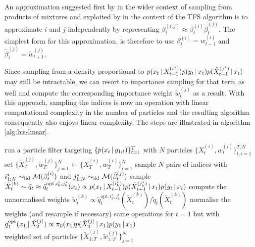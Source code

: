 An approximation suggested first by \citet{briers05} in the wider context of sampling from products of mixtures and exploited by \citet{fearnhead10, taghavi12} in the context of the TFS algorithm is to approximate $i$ and $j$ independently by representing $\beta^{(i,j)}_{t}\approx \beta^{(i)}_{t}\tilde\beta^{(j)}_{t}$. The simplest form for this approximation, is therefore to use $\beta^{(i)}_{t} = w^{(i)}_{t-1}$ and $\tilde\beta^{(j)}_{t}=\tilde w^{(j)}_{t+1}$. 

Since sampling from a density proportional to $p(x_{t}\,|\, X^{(i^{\star})}_{t-1})p(y_{t}\,|\, x_{t})p(\tilde X^{(j^{\star})}_{t+1}\,|\, x_{t})$ may still be intractable, we can resort to importance sampling for that term as well and compute the corresponding importance weight $\tilde w_{t}^{(j)}$ as a result.
With this approach, sampling the indices is now an operation with linear computational complexity in the number of particles and the resulting algorithm consequently also enjoys linear complexity. 
The steps are illustrated in algorithm \ref{alg:bis-linear}. 
%
\begin{algorithm}[!h]\small
	\caption{\label{alg:bis-linear}}
	\begin{algorithmic}[1]
		\State run a particle filter targeting $\{p(x_{t}\,|\, y_{1:t})\}_{t=1}^{T}$ with $N$ particles $\{X^{(i)}_{t}, w^{(i)}_{t}\}_{t,i=1}^{T,N}$
		\State set $\{\tilde X^{(j)}_{T},\tilde w^{(j)}_{T}\}_{j=1}^{N}\leftarrow \{X^{(i)}_{T},w^{(i)}_{T}\}_{i=1}^{N}$
			\State sample $N$ pairs of indices with $i^{\star}_{1:N} \sim_{\mathrm{iid}} \mathcal M(\beta^{(i)}_{t})$ and $j^{\star}_{1:N}\sim_{\mathrm{iid}} \mathcal M(\tilde\beta^{(j)}_{t})$
				\State sample $\tilde X^{(k)}_{t}\sim \tilde  q_{t} \approx \tilde q_{t}^{\text{opt}, i^{\star}_{k}, j^{\star}_{k}}(x_{t}) \propto p(x_{t}\,|\, X^{(i^{\star}_{k})}_{t-1})p(\tilde X^{(j^{\star}_{k})}_{t+1}\,|\, x_{t})p(y_{t}\,|\, x_{t})$
	    			\State compute the unnormalised weights $\tilde w^{(k)}_{t} \propto \tilde q^{\text{opt}, i^{\star}_{k},j^{\star}_{k}}_{t}(\tilde X^{(k)}_{t})/\tilde q_{t}(\tilde X^{(k)}_{t})$
			\EndFor
			\State normalise the weights (and resample if necessary)
		\EndFor
	\State same operations for $t=1$ but with $\tilde q^{\text{opt}}_{1}(x_{1}\,|\, \tilde X^{(j)}_{2}) \propto \pi_{0}(x_{1})p(\tilde X^{(j)}_{2}\,|\, x_{1})p(y_{1}\,|\, x_{1})$\\
	\Return weighted set of particles $\{\tilde X^{(j)}_{1:T}, \tilde w^{(j)}_{1:T}\}_{j=1}^{N}$
	\end{algorithmic}
\end{algorithm}

